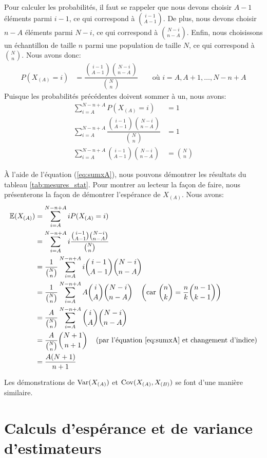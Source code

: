 \documentclass[10pt]{article}
\begin{document}
Pour calculer les probabilités, il faut se rappeler que nous devons
choisir \(A-1\) éléments parmi \(i-1\), ce qui correspond à
\(\binom{i-1}{A-1}\). De plus, nous devons choisir \(n-A\) éléments
parmi \(N-i\), ce qui correspond à \(\binom{N-i}{n-A}\). Enfin, nous
choisissons un échantillon de taille \(n\) parmi une population de
taille \(N\), ce qui correspond à \(\binom{N}{n}\). Nous avons donc:
\begin{align*}
P(X_{(A)}=i) &= \dfrac{\binom{i-1}{A-1}\binom{N-i}{n-A}}{\binom{N}{n}} \qquad \text{où } i=A,A+1,\ldots,N-n+A
\end{align*} Puisque les probabilités précédentes doivent sommer à un,
nous avons: \begin{align}
\sum_{i=A}^{N-n+A} P(X_{(A)}=i) &= 1 \nonumber\\
\sum_{i=A}^{N-n+A} \dfrac{\binom{i-1}{A-1}\binom{N-i}{n-A}}{\binom{N}{n}} &= 1 \nonumber\\
\sum_{i=A}^{N-n+A} \binom{i-1}{A-1}\binom{N-i}{n-A} &= \binom{N}{n} \label{eq:sumxA}
\end{align}

À l'aide de l'équation (\ref{eq:sumxA}), nous pouvons démontrer les
résultats du tableau \ref{tab:mesures_stat}. Pour montrer au lecteur la
façon de faire, nous présenterons la façon de démontrer l'espérance de
\(X_{(A)}\). Nous avons: \begin{align}
\operatorname{\mathbb{E}}(X_{(A)}) &= \sum_{i=A}^{N-n+A} iP(X_{(A)}=i) \nonumber\\
&= \sum_{i=A}^{N-n+A} i\dfrac{\binom{i-1}{A-1}\binom{N-i}{n-A}}{\binom{N}{n}} \nonumber\\
&= \dfrac{1}{\binom{N}{n}}\sum_{i=A}^{N-n+A} i\binom{i-1}{A-1}\binom{N-i}{n-A} \nonumber\\
&= \dfrac{1}{\binom{N}{n}}\sum_{i=A}^{N-n+A} A\binom{i}{A}\binom{N-i}{n-A} 
\quad\left(\text{car $\binom{n}{k}=\dfrac{n}{k}\binom{n-1}{k-1}$}\right) \nonumber\\
&= \dfrac{A}{\binom{N}{n}}\sum_{i=A}^{N-n+A} \binom{i}{A}\binom{N-i}{n-A} \nonumber\\
&= \dfrac{A}{\binom{N}{n}}\binom{N+1}{n+1} \quad\left(\text{par l'équation \ref{eq:sumxA} et changement d'indice}\right) \nonumber\\
&= \dfrac{A(N+1)}{n+1} \label{eq:esperancexA}
\end{align}

Les démonstrations de \(\operatorname{Var}(X_{(A)})\) et \(\operatorname{Cov}(X_{(A)},X_{(B)})\) se
font d'une manière similaire.

\hypertarget{calculs-desperance-et-de-variance-destimateurs}{%
\section{\texorpdfstring{Calculs d'espérance et de variance
d'estimateurs
\label{calculs_estimateurs}}{Calculs d'espérance et de variance d'estimateurs }}\label{calculs-desperance-et-de-variance-destimateurs}}
\end{document}
